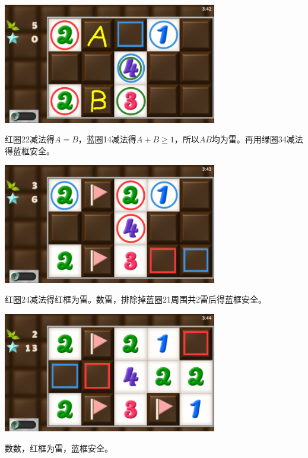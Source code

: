 \subsection{} %
\begin{center}
    \includegraphics[width=0.7\textwidth]{puzzle/90-1.png}
\end{center}
红圈22减法得$A=B$，蓝圈14减法得$A+B\ge 1$，所以$AB$均为雷。再用绿圈34减法得蓝框安全。
\begin{center}
    \includegraphics[width=0.7\textwidth]{puzzle/90-2.png}
\end{center}
红圈24减法得红框为雷。数雷，排除掉蓝圈21周围共2雷后得蓝框安全。
\begin{center}
    \includegraphics[width=0.7\textwidth]{puzzle/90-3.png}
\end{center}
数数，红框为雷，蓝框安全。

